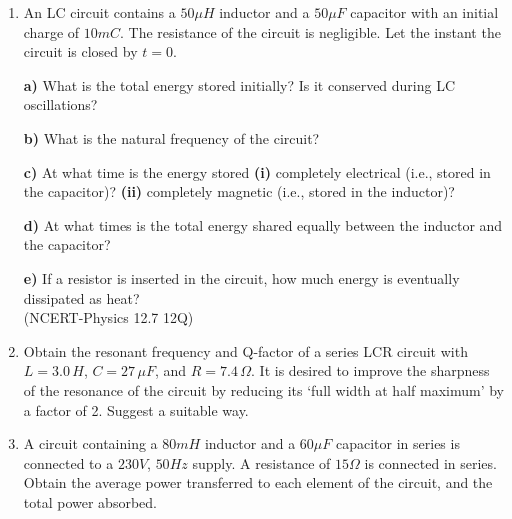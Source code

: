 \begin{enumerate}[label=\thesection.\arabic*,ref=\thesection.\theenumi]
\item An LC circuit contains a $50 \mu H$ inductor and a $50 \mu F$ capacitor with an initial charge of $10 mC$. The resistance of the circuit is negligible. Let the instant the circuit is closed by $t = 0$.

\textbf{a)} What is the total energy stored initially? Is it conserved during LC oscillations?

\textbf{b)} What is the natural frequency of the circuit?

\textbf{c)} At what time is the energy stored \textbf{(i)} completely electrical (i.e., stored in the capacitor)? \textbf{(ii)} completely magnetic (i.e., stored in the inductor)?

\textbf{d)} At what times is the total energy shared equally between the inductor and the capacitor?

\textbf{e)} If a resistor is inserted in the circuit, how much energy is eventually dissipated as heat? \\
\hfill(NCERT-Physics 12.7 12Q)\\
\solution 
\pagebreak 

\item Obtain the resonant frequency and Q-factor of a series LCR circuit with $L = 3.0\, H$, $C = 27\, \mu F$, and $R = 7.4\, \Omega$. It is desired to improve the sharpness of the resonance of the circuit by reducing its `full width at half maximum' by a factor of 2. Suggest a suitable way.\\
\solution


\pagebreak
\item A circuit containing a $80 mH$ inductor and a $60 \mu F$ capacitor in series is connected to a $230 V$, $50 Hz$ supply. A resistance of $15 \Omega $ is connected in series. Obtain the average power transferred to each element of the circuit, and the total power absorbed.\\
\solution

\pagebreak


\end{enumerate}

